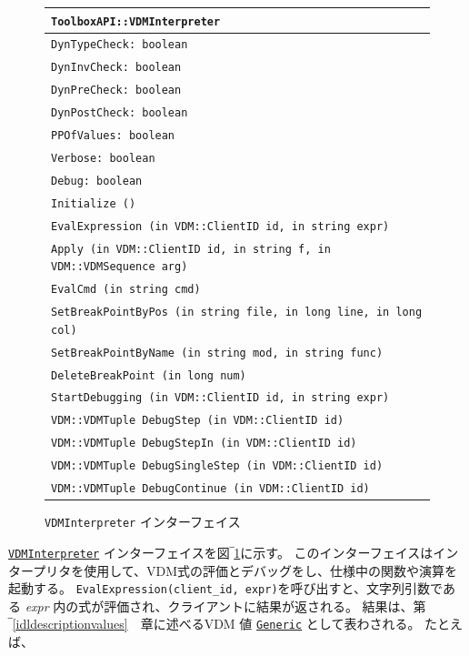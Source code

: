 \documentclass[\pformat,12pt]{jarticle}
\newcommand{\Generic}{\hyperlink{interface.Generic}{Generic}}
\newcommand{\VDMInterpreter}{\hyperlink{interface.VDMInterpreter}{VDMInterpreter}}
\begin{document}

\begin{figure}[tbh]
\begin{center}
\begin{tabular}{|l|}
\hline
{\tt ToolboxAPI::VDMInterpreter } \\
\hline
{\tt DynTypeCheck: boolean } \\
{\tt DynInvCheck: boolean } \\
{\tt DynPreCheck: boolean } \\
{\tt DynPostCheck: boolean } \\
{\tt PPOfValues: boolean } \\
{\tt Verbose: boolean } \\
{\tt Debug: boolean } \\
\hline
{\tt Initialize () } \\
{\tt EvalExpression (in VDM::ClientID id, in string expr) } \\
{\tt Apply (in VDM::ClientID id, in string f, in VDM::VDMSequence arg) } \\
{\tt EvalCmd (in string cmd) } \\
{\tt SetBreakPointByPos (in string file, in long line, in long col) } \\
{\tt SetBreakPointByName (in string mod, in string func) } \\
{\tt DeleteBreakPoint (in long num) } \\
{\tt StartDebugging (in VDM::ClientID id, in string expr) } \\
{\tt VDM::VDMTuple DebugStep (in VDM::ClientID id) } \\
{\tt VDM::VDMTuple DebugStepIn (in VDM::ClientID id) } \\
{\tt VDM::VDMTuple DebugSingleStep (in VDM::ClientID id) } \\
{\tt VDM::VDMTuple DebugContinue (in VDM::ClientID id) } \\
\hline
\end{tabular}
\caption{{\tt VDMInterpreter} インターフェイス}\label{fig:VDMInterpreter}
\end{center}
\end{figure}

 {\tt \VDMInterpreter} インターフェイスを図‾\ref{fig:VDMInterpreter}に示す。
このインターフェイスはインタープリタを使用して、VDM式の評価とデバッグをし、仕様中の関数や演算を起動する。
{\tt EvalExpression(client\_id, expr)}を呼び出すと、文字列引数である {\em expr} 内の式が評価され、クライアントに結果が返される。
結果は、第‾\ref{idldescriptionvalues}　章に述べるVDM 値 {\tt \Generic} として表わされる。
たとえば、
\end{document}
